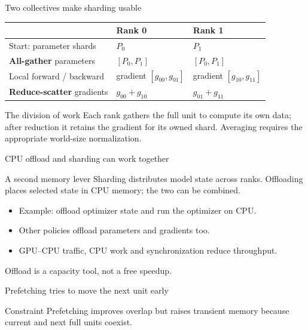 \documentclass[handout]{beamer}
\begin{document}
\begin{frame}{Two collectives make sharding usable}
  \centering\small
  \begin{tabular}{@{}lll@{}}
    \toprule
    & Rank 0 & Rank 1 \\
    \midrule
    Start: parameter shards & $P_0$ & $P_1$ \\
    \textbf{All-gather} parameters & $[P_0,P_1]$ & $[P_0,P_1]$ \\
    Local forward / backward & gradient $[g_{00},g_{01}]$ & gradient $[g_{10},g_{11}]$ \\
    \textbf{Reduce-scatter} gradients & $g_{00}+g_{10}$ & $g_{01}+g_{11}$ \\
    \bottomrule
  \end{tabular}
  \vfill
  \begin{block}{The division of work}
    Each rank gathers the full unit to compute its own data; after reduction it retains the gradient for its owned shard. Averaging requires the appropriate world-size normalization.
  \end{block}
\end{frame}
\begin{frame}{CPU offload and sharding can work together}
  \begin{block}{A second memory lever}
    Sharding distributes model state across ranks. Offloading places selected state in CPU memory; the two can be combined.
  \end{block}
  \begin{itemize}
    \item Example: offload optimizer state and run the optimizer on CPU.
    \item Other policies offload parameters and gradients too.
    \item GPU--CPU traffic, CPU work and synchronization reduce throughput.
  \end{itemize}
  \small Offload is a capacity tool, not a free speedup.
\end{frame}

\begin{frame}{Prefetching tries to move the next unit early}
  \begin{center}
  \end{center}
  \begin{alertblock}{Constraint}
    Prefetching improves overlap but raises transient memory because current and next full units coexist.
  \end{alertblock}
\end{frame}
\end{document}
